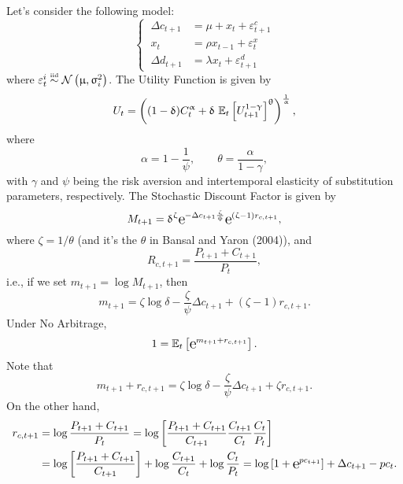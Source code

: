 	Let's consider the following model:
\begin{equation}
	\left\{
	\begin{aligned}
		\ \Delta c_{t+1} & = \mu + x_t + \varepsilon_{t+1}^c \\
		\ x_t & = \rho x_{t-1} + \varepsilon_{t}^x \\
		\ \Delta d_{t+1} & = \lambda x_t + \varepsilon_{t+1}^d
	\end{aligned}
	\right.
\end{equation}
where $\varepsilon_t^i\overset{\text{\tiny iid}}{\sim} \mathcal{N}\left(\upmu, \upsigma_i^2\right)$. The Utility Function is given by 
\begin{equation}
	U_t = \left((1-\delta) C_t^{\alpha} + \delta \ \E_t\left[U_{t+1}^{1-\gamma}\right]^\theta\right)^{\frac{1}{\alpha}},
\end{equation}
where 
\begin{equation}
	\alpha = 1 - \frac{1}{\psi}, \quad\quad \theta = \frac{\alpha}{1-\gamma},
\end{equation}
with $\gamma$ and $\psi$ being the risk aversion and intertemporal elasticity of substitution parameters, respectively. The Stochastic Discount Factor is given by 
\begin{equation}
	M_{t+1} = \delta^\zeta \e{-\Delta c_{t+1}\frac{\zeta}{\psi}} \e{(\zeta-1)r_{c,t+1}},
\end{equation}
where $\zeta =1/\theta$ (and it's the $\theta$ in Bansal and Yaron (2004)), and
\begin{equation}
	R_{c,t+1} = \frac{P_{t+1}+C_{t+1}}{P_t},
\end{equation}
i.e., if we set $m_{t+1} = \log M_{t+1}$, then
\begin{equation}\label{mt}
	m_{t+1} = \zeta \log\delta - \frac{\zeta}{\psi}\Delta c_{t+1} + (\zeta-1)r_{c,t+1}.
\end{equation}
Under No Arbitrage,
\begin{equation}\label{na}
	1 = \E_t\left[\e{m_{t+1} + r_{c,t+1}}\right].
\end{equation}
Note that
$$
m_{t+1} + r_{c,t+1} = \zeta \log\delta - \frac{\zeta}{\psi}\Delta c_{t+1} + \zeta r_{c,t+1}.
$$
On the other hand,
$$
\begin{aligned}
	r_{c,t+1} &= \log \frac{P_{t+1}+C_{t+1}}{P_t} = \log \left[\frac{P_{t+1}+C_{t+1}}{C_{t+1}}\frac{C_{t+1}}{C_t}\frac{C_t}{P_t}\right] \\
	&= \log\left[\frac{P_{t+1}+C_{t+1}}{C_{t+1}}\right] + \log\frac{C_{t+1}}{C_t} + \log \frac{C_t}{P_t} = \log\left[1+ \e{pc_{t+1}}\right] + \Delta c_{t+1} - pc_{t}.\\		
\end{aligned}
$$
